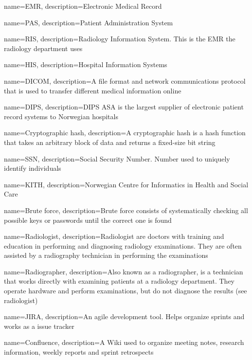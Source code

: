{
    name=EMR,
    description={Electronic Medical Record}
}

{
    name=PAS,
    description={Patient Administration System}
}

{
    name=RIS,
    description={Radiology Information System. This is the EMR the radiology department uses}
}

{
    name=HIS,
    description={Hospital Information Systems}
}

{
    name=DICOM,
    description={A file format and network communications protocol that is used to transfer different medical information online}
}

{
    name=DIPS,
    description={DIPS ASA is the largest supplier of electronic patient record systems to Norwegian hospitals}
}

{
    name=Cryptographic hash,
    description={A cryptographic hash is a hash function that takes an arbitrary block of data and returns a fixed-size bit string}
}

{
    name=SSN,
    description={Social Security Number. Number used to uniquely identify individuals}
}

{
    name=KITH,
    description={Norwegian Centre for Informatics in Health and Social Care}
}

{
    name=Brute force,
    description={Brute force consists of systematically checking all possible keys or passwords until the correct one is found}
}

{
    name=Radiologist,
    description={Radiologist are doctors with training and education in performing and diagnosing radiology examinations. They are often assisted by a radiography technician in performing the examinations}
}

{
    name=Radiographer,
    description={Also known as a radiographer, is a technician that works directly with examining patients at a radiology department. They operate hardware and perform examinations, but do not diagnose the results (see radiologist)}
}

{
    name=JIRA,
    description={An agile development tool. Helps organize sprints and works as a issue tracker}
}

{
    name=Confluence,
    description={A Wiki used to organize meeting notes, research information, weekly reports and sprint retrospects}
}

